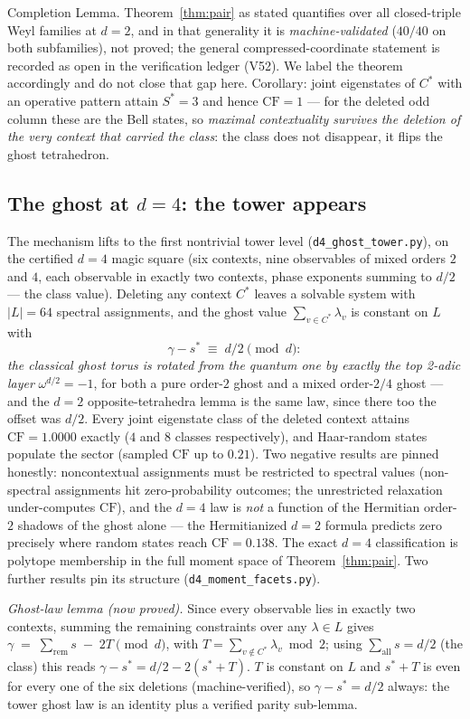 \documentclass[11pt]{article}
\theoremstyle{remark}
\theoremstyle{plain}
\begin{document}
Completion Lemma. Theorem~\ref{thm:pair} as stated quantifies over all closed-triple Weyl
families at $d=2$, and in that generality it is \emph{machine-validated} ($40/40$ on both
subfamilies), not proved; the general compressed-coordinate statement is recorded as open in
the verification ledger (V52). We label the theorem accordingly and do not close that gap
here. Corollary: joint eigenstates of $C^*$ with an operative
pattern attain $S^*=3$ and hence $\mathrm{CF}=1$ --- for the deleted odd column these
are the Bell states, so \emph{maximal contextuality survives the deletion of the very
context that carried the class}: the class does not disappear, it flips the ghost
tetrahedron.

\subsection*{The ghost at $d=4$: the tower appears}
The mechanism lifts to the first nontrivial tower level
(\texttt{d4\_ghost\_tower.py}), on the certified $d=4$ magic square (six contexts, nine
observables of mixed orders $2$ and $4$, each observable in exactly two contexts, phase
exponents summing to $d/2$ --- the class value). Deleting any context $C^*$ leaves a
solvable system with $|L|=64$ spectral assignments, and the ghost value
$\sum_{v\in C^*}\lambda_v$ is constant on $L$ with
\[ \gamma - s^{*} \;\equiv\; d/2 \pmod d : \]
\emph{the classical ghost torus is rotated from the quantum one by exactly the top
2-adic layer} $\omega^{d/2}=-1$, for both a pure order-$2$ ghost and a mixed
order-$2/4$ ghost --- and the $d=2$ opposite-tetrahedra lemma is the same law, since
there too the offset was $d/2$. Every joint eigenstate class of the deleted context
attains $\mathrm{CF}=1.0000$ exactly ($4$ and $8$ classes respectively), and
Haar-random states populate the sector (sampled $\mathrm{CF}$ up to $0.21$).
Two negative results are pinned honestly: noncontextual assignments must be restricted
to spectral values (non-spectral assignments hit zero-probability outcomes; the
unrestricted relaxation under-computes $\mathrm{CF}$), and the $d=4$ law is \emph{not}
a function of the Hermitian order-$2$ shadows of the ghost alone --- the Hermitianized
$d=2$ formula predicts zero precisely where random states reach $\mathrm{CF}=0.138$.
The exact $d=4$ classification is polytope membership in the full moment space of
Theorem~\ref{thm:pair}. Two further results pin its structure
(\texttt{d4\_moment\_facets.py}).

\emph{Ghost-law lemma (now proved).} Since every observable lies in exactly two
contexts, summing the remaining constraints over any $\lambda\in L$ gives
$\gamma \;=\; \sum_{\mathrm{rem}} s \; - \; 2T \pmod d$, with
$T=\sum_{v\notin C^*}\lambda_v \bmod 2$; using $\sum_{\mathrm{all}} s = d/2$ (the
class) this reads $\gamma-s^{*} = d/2 - 2(s^{*}+T)$. $T$ is constant on $L$ and
$s^{*}+T$ is even for every one of the six deletions (machine-verified), so
$\gamma-s^{*}=d/2$ always: the tower ghost law is an identity plus a verified parity
sub-lemma.
\end{document}
